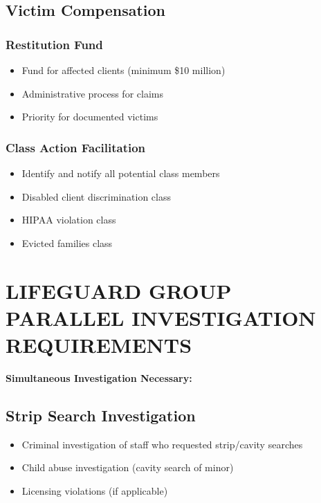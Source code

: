 \documentclass[11pt,letterpaper]{article}
\begin{document}
\subsection{Victim Compensation}

\subsubsection{Restitution Fund}
\begin{itemize}[leftmargin=*]
\item Fund for affected clients (minimum \$10 million)
\item Administrative process for claims
\item Priority for documented victims
\end{itemize}

\subsubsection{Class Action Facilitation}
\begin{itemize}[leftmargin=*]
\item Identify and notify all potential class members
\item Disabled client discrimination class
\item HIPAA violation class
\item Evicted families class
\end{itemize}

\newpage

\section{LIFEGUARD GROUP PARALLEL INVESTIGATION REQUIREMENTS}

\textbf{Simultaneous Investigation Necessary:}

\subsection{Strip Search Investigation}
\begin{itemize}[leftmargin=*]
\item Criminal investigation of staff who requested strip/cavity searches
\item Child abuse investigation (cavity search of minor)
\item Licensing violations (if applicable)
\end{itemize}
\end{document}
